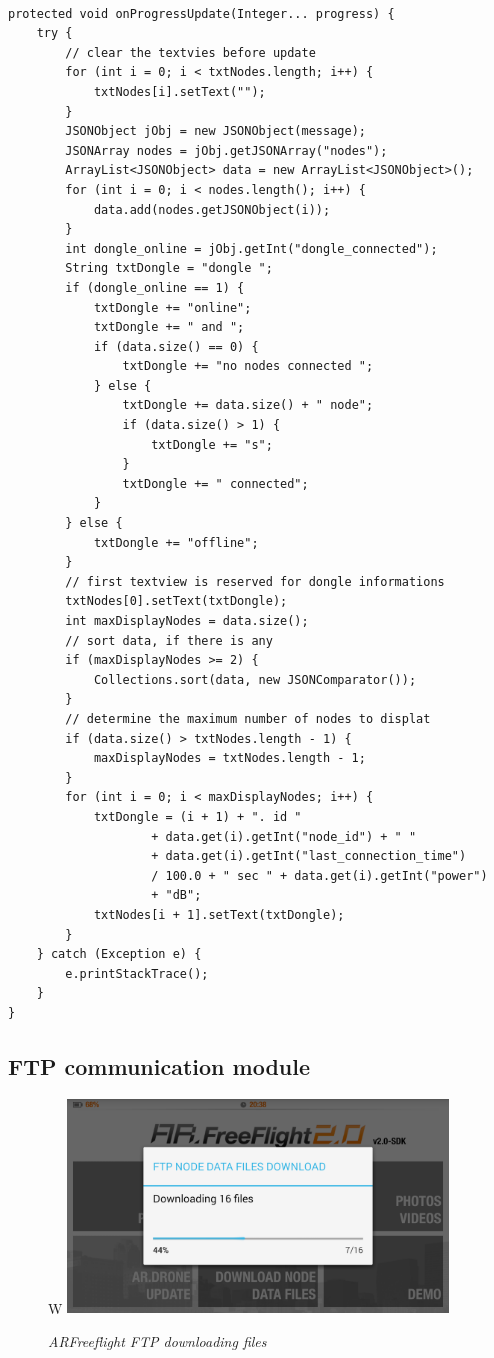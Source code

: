
\begin{lstlisting}
 
protected void onProgressUpdate(Integer... progress) {
	try {
		// clear the textvies before update
		for (int i = 0; i < txtNodes.length; i++) {
			txtNodes[i].setText("");
		}
		JSONObject jObj = new JSONObject(message);
		JSONArray nodes = jObj.getJSONArray("nodes");
		ArrayList<JSONObject> data = new ArrayList<JSONObject>();
		for (int i = 0; i < nodes.length(); i++) {
			data.add(nodes.getJSONObject(i));
		}
		int dongle_online = jObj.getInt("dongle_connected");
		String txtDongle = "dongle ";
		if (dongle_online == 1) {
			txtDongle += "online";
			txtDongle += " and ";
			if (data.size() == 0) {
				txtDongle += "no nodes connected ";
			} else {
				txtDongle += data.size() + " node";
				if (data.size() > 1) {
					txtDongle += "s";
				}
				txtDongle += " connected";
			}
		} else {
			txtDongle += "offline";
		}
		// first textview is reserved for dongle informations
		txtNodes[0].setText(txtDongle);
		int maxDisplayNodes = data.size();
		// sort data, if there is any
		if (maxDisplayNodes >= 2) {
			Collections.sort(data, new JSONComparator());
		}
		// determine the maximum number of nodes to displat
		if (data.size() > txtNodes.length - 1) {
			maxDisplayNodes = txtNodes.length - 1;
		}
		for (int i = 0; i < maxDisplayNodes; i++) {
			txtDongle = (i + 1) + ". id "
					+ data.get(i).getInt("node_id") + " "
					+ data.get(i).getInt("last_connection_time")
					/ 100.0 + " sec " + data.get(i).getInt("power")
					+ "dB";
			txtNodes[i + 1].setText(txtDongle);
		}
	} catch (Exception e) {
		e.printStackTrace();
	}
}

\end{lstlisting}

\subsection{FTP communication module}

\begin{figure}[ht]
\begin{center}W
\includegraphics[width=0.9\textwidth]{implementation/android_ftp.png}
\end{center}
\caption{\small \itshape{ARFreeflight FTP downloading files}}
\end{figure}

